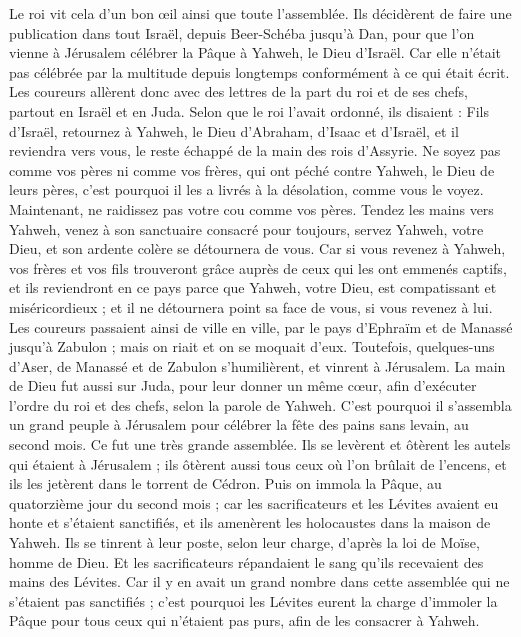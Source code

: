 \begin{multicols}{2}
Le roi vit cela d'un bon œil ainsi que toute l'assemblée.
Ils décidèrent de faire une publication dans tout Israël, depuis Beer-Schéba jusqu'à Dan, pour que l'on vienne à Jérusalem célébrer la Pâque à Yahweh, le Dieu d'Israël. Car elle n'était pas célébrée par la multitude depuis longtemps conformément à ce qui était écrit.
Les coureurs allèrent donc avec des lettres de la part du roi et de ses chefs, partout en Israël et en Juda. Selon que le roi l'avait ordonné, ils disaient : Fils d'Israël, retournez à Yahweh, le Dieu d'Abraham, d'Isaac et d'Israël, et il reviendra vers vous, le reste échappé de la main des rois d'Assyrie.
Ne soyez pas comme vos pères ni comme vos frères, qui ont péché contre Yahweh, le Dieu de leurs pères, c'est pourquoi il les a livrés à la désolation, comme vous le voyez.
Maintenant, ne raidissez pas votre cou comme vos pères. Tendez les mains vers Yahweh, venez à son sanctuaire consacré pour toujours, servez Yahweh, votre Dieu, et son ardente colère se détournera de vous.
Car si vous revenez à Yahweh, vos frères et vos fils trouveront grâce auprès de ceux qui les ont emmenés captifs, et ils reviendront en ce pays parce que Yahweh, votre Dieu, est compatissant et miséricordieux ; et il ne détournera point sa face de vous, si vous revenez à lui.
Les coureurs passaient ainsi de ville en ville, par le pays d'Ephraïm et de Manassé jusqu'à Zabulon ; mais on riait et on se moquait d'eux.
Toutefois, quelques-uns d'Aser, de Manassé et de Zabulon s'humilièrent, et vinrent à Jérusalem.
La main de Dieu fut aussi sur Juda, pour leur donner un même cœur, afin d'exécuter l'ordre du roi et des chefs, selon la parole de Yahweh.
C'est pourquoi il s'assembla un grand peuple à Jérusalem pour célébrer la fête des pains sans levain, au second mois. Ce fut une très grande assemblée.
Ils se levèrent et ôtèrent les autels qui étaient à Jérusalem ; ils ôtèrent aussi tous ceux où l'on brûlait de l'encens, et ils les jetèrent dans le torrent de Cédron.
Puis on immola la Pâque, au quatorzième jour du second mois ; car les sacrificateurs et les Lévites avaient eu honte et s'étaient sanctifiés, et ils amenèrent les holocaustes dans la maison de Yahweh.
Ils se tinrent à leur poste, selon leur charge, d'après la loi de Moïse, homme de Dieu. Et les sacrificateurs répandaient le sang qu'ils recevaient des mains des Lévites.
Car il y en avait un grand nombre dans cette assemblée qui ne s'étaient pas sanctifiés ; c'est pourquoi les Lévites eurent la charge d'immoler la Pâque pour tous ceux qui n'étaient pas purs, afin de les consacrer à Yahweh.

\end{multicols}
